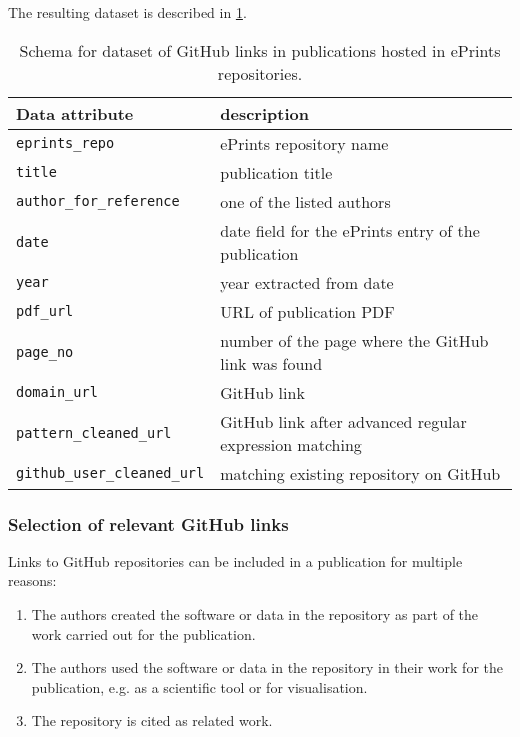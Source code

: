 \documentclass[10pt,a4paper]{scrartcl}
\begin{document}
The resulting dataset is described in \ref{table:github_eprints}.

\begin{table}
    \begin{tabular}{|l|l|}
        \hline
        Data attribute & description \\
        \hline 
        \verb|eprints_repo| & ePrints repository name\\
        \verb|title| & publication title\\
        \verb|author_for_reference| & one of the listed authors\\
        \verb|date| & date field for the ePrints entry of the publication\\
        \verb|year| & year extracted from date\\
        \verb|pdf_url| & URL of publication PDF\\
        \verb|page_no| & number of the page where the GitHub link was found\\
        \verb|domain_url| & GitHub link\\
        \verb|pattern_cleaned_url| & GitHub link after advanced regular expression matching\\
        \verb|github_user_cleaned_url| & matching existing repository on GitHub\\
        \hline
    \end{tabular}
    \caption{Schema for dataset of GitHub links in publications hosted in ePrints repositories.}
    \label{table:github_eprints}
\end{table}

\subsubsection*{Selection of relevant GitHub links}

Links to GitHub repositories can be included in a publication for multiple reasons:
\begin{enumerate}
    \item The authors created the software or data in the repository as part of the work carried out for the publication.
    \item The authors used the software or data in the repository in their work for the publication, e.g. as a scientific tool or for visualisation.
    \item The repository is cited as related work.
\end{enumerate}
\end{document}

